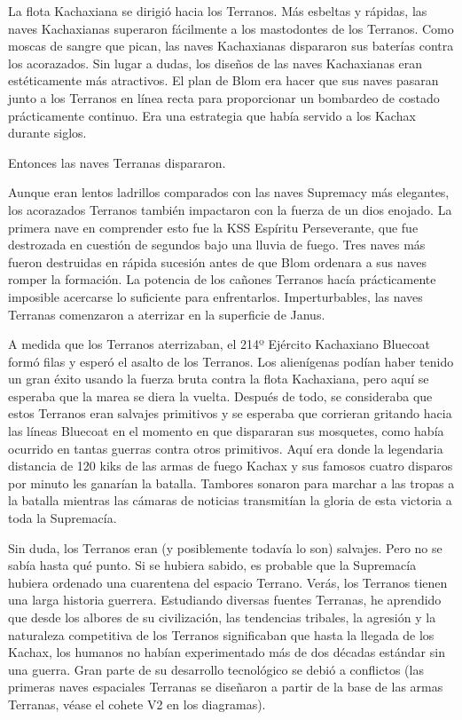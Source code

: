 \documentclass[spanish,12pt,a4paper,oneside,titlepage, twocolumn]{article}
\begin{document}
    La flota Kachaxiana se dirigió hacia los Terranos. Más esbeltas y rápidas, las naves Kachaxianas superaron fácilmente a los mastodontes de los Terranos. Como moscas de sangre que pican, las naves Kachaxianas dispararon sus baterías contra los acorazados. Sin lugar a dudas, los diseños de las naves Kachaxianas eran estéticamente más atractivos. El plan de Blom era hacer que sus naves pasaran junto a los Terranos en línea recta para proporcionar un bombardeo de costado prácticamente continuo. Era una estrategia que había servido a los Kachax durante siglos.

    Entonces las naves Terranas dispararon.

    Aunque eran lentos ladrillos comparados con las naves Supremacy más elegantes, los acorazados Terranos también impactaron con la fuerza de un dios enojado. La primera nave en comprender esto fue la KSS Espíritu Perseverante, que fue destrozada en cuestión de segundos bajo una lluvia de fuego. Tres naves más fueron destruidas en rápida sucesión antes de que Blom ordenara a sus naves romper la formación. La potencia de los cañones Terranos hacía prácticamente imposible acercarse lo suficiente para enfrentarlos. Imperturbables, las naves Terranas comenzaron a aterrizar en la superficie de Janus.

    A medida que los Terranos aterrizaban, el 214º Ejército Kachaxiano Bluecoat formó filas y esperó el asalto de los Terranos. Los alienígenas podían haber tenido un gran éxito usando la fuerza bruta contra la flota Kachaxiana, pero aquí se esperaba que la marea se diera la vuelta. Después de todo, se consideraba que estos Terranos eran salvajes primitivos y se esperaba que corrieran gritando hacia las líneas Bluecoat en el momento en que dispararan sus mosquetes, como había ocurrido en tantas guerras contra otros primitivos. Aquí era donde la legendaria distancia de 120 kiks de las armas de fuego Kachax y sus famosos cuatro disparos por minuto les ganarían la batalla. Tambores sonaron para marchar a las tropas a la batalla mientras las cámaras de noticias transmitían la gloria de esta victoria a toda la Supremacía.

    Sin duda, los Terranos eran (y posiblemente todavía lo son) salvajes. Pero no se sabía hasta qué punto. Si se hubiera sabido, es probable que la Supremacía hubiera ordenado una cuarentena del espacio Terrano. Verás, los Terranos tienen una larga historia guerrera. Estudiando diversas fuentes Terranas, he aprendido que desde los albores de su civilización, las tendencias tribales, la agresión y la naturaleza competitiva de los Terranos significaban que hasta la llegada de los Kachax, los humanos no habían experimentado más de dos décadas estándar sin una guerra. Gran parte de su desarrollo tecnológico se debió a conflictos (las primeras naves espaciales Terranas se diseñaron a partir de la base de las armas Terranas, véase el cohete V2 en los diagramas).
\end{document}
